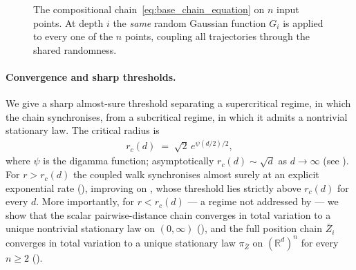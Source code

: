 \documentclass{article}
\newcommand{\RR}{\mathbb{R}}
\newcommand{\bZ}{\bar{Z}}
\begin{document}
\begin{figure}
  \centering
  \caption{The compositional chain~\eqref{eq:base_chain_equation} on $n$ input points. At depth $i$ the \emph{same} random Gaussian function $G_i$ is applied to every one of the $n$ points, coupling all trajectories through the shared randomness.}
  \label{fig:composition}
\end{figure}

\paragraph{Convergence and sharp thresholds.}
We give a sharp almost-sure threshold separating a supercritical regime, in which the chain synchronises, from a subcritical regime, in which it admits a nontrivial stationary law. The critical radius is
\begin{eqnarray*}
  r_c(d) \;=\; \sqrt{2}\,e^{\psi(d/2)/2},
\end{eqnarray*}
where $\psi$ is the digamma function; asymptotically $r_c(d) \sim \sqrt{d}$ as $d \to \infty$ (see ). For $r > r_c(d)$ the coupled walk synchronises almost surely at an explicit exponential rate (), improving on \citet{dunlop2018how}, whose threshold lies strictly above $r_c(d)$ for every $d$. More importantly, for $r < r_c(d)$ --- a regime not addressed by \citet{dunlop2018how} --- we show that the scalar pairwise-distance chain converges in total variation to a unique nontrivial stationary law on $(0,\infty)$ (), and the full position chain $\bZ_i$ converges in total variation to a unique stationary law $\pi_{\bZ}$ on $(\RR^d)^n$ for every $n \ge 2$ ().
\end{document}
